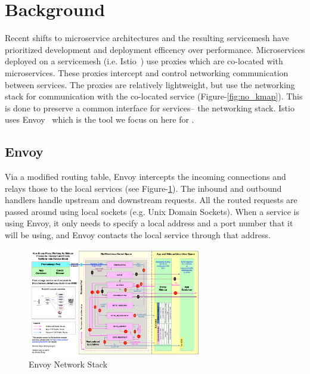 \section{Background}
\label{sec:background}
Recent shifts to microservice architectures and the resulting servicemesh have prioritized development and deployment efficency over performance.
Microservices deployed on a servicemesh (i.e. Istio~\cite{istio}) use proxies which are co-located with microservices.
These proxies intercept and control networking communication between services.
The proxies are relatively lightweight, but use the networking stack for communication with the co-located service (Figure-\ref{fig:no_kmap}).
This is done to preserve a common interface for services-- the networking stack.
Istio uses Envoy~\cite{envoy} which is the tool we focus on here for \sysname.

\subsection{Envoy}
Via a modified routing table, Envoy intercepts the incoming connections and relays those to the local services (see Figure-\ref{fig:envoy}). 
The inbound and outbound handlers handle upstream and downstream requests. 
All the routed requests are passed around using local sockets (e.g. Unix Domain Sockets). 
When a service is using Envoy, it only needs to specify a local address and a port number that it will be using, and Envoy contacts the local service through that address. 

\begin{figure}[!htb]
    \begin{minipage}{\textwidth}
        \centering
        \includegraphics[keepaspectratio=true,width=3in]{figures/background/envoy.png}
        \caption{Envoy Network Stack~\cite{envoy_image}}
        \label{fig:envoy}
    \end{minipage}%
\end{figure}

